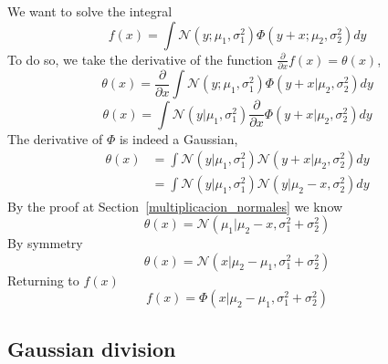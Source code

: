 \documentclass[article]{jss}
\newcommand{\N}{\mathcal{N}}
\begin{document}
We want to solve the integral
\begin{equation}
 f(x) = \int \N(y;\mu_1,\sigma_1^2)\Phi(y+x;\mu_2,\sigma_2^2) dy
\end{equation}
%
To do so, we take the derivative of the function $\frac{\partial}{\partial x}f(x) = \theta(x)$,
\begin{equation}
 \theta(x) = \frac{\partial}{\partial x}\int \N(y;\mu_1,\sigma_1^2)\Phi(y+x|\mu_2,\sigma_2^2) dy
\end{equation}
%
\begin{equation}
 \theta(x) = \int \N(y|\mu_1,\sigma_1^2)\frac{\partial}{\partial x}\Phi(y+x|\mu_2,\sigma_2^2) dy
\end{equation}
%
The derivative of $\Phi$ is indeed a Gaussian,
\begin{equation}
\begin{split}
\theta(x) & = \int \N(y|\mu_1,\sigma_1^2)\N(y+x|\mu_2,\sigma_2^2) dy \\
& = \int \N(y|\mu_1,\sigma_1^2)\N(y|\mu_2-x,\sigma_2^2) dy
\end{split}
\end{equation}
%
By the proof at Section~\ref{multiplicacion_normales} we know
\begin{equation}
 \theta(x) = \N(\mu_1| \mu_2 - x, \sigma_1^2 + \sigma_2^2)
\end{equation}
%
By symmetry
\begin{equation}
 \theta(x) = \N(x| \mu_2 - \mu_1, \sigma_1^2 + \sigma_2^2)
\end{equation}
%
Returning to $f(x)$
\begin{equation}
 f(x) = \Phi(x| \mu_2 - \mu_1, \sigma_1^2 + \sigma_2^2)
\end{equation}

\subsection{Gaussian division}\label{sec:division_normales}
\end{document}
